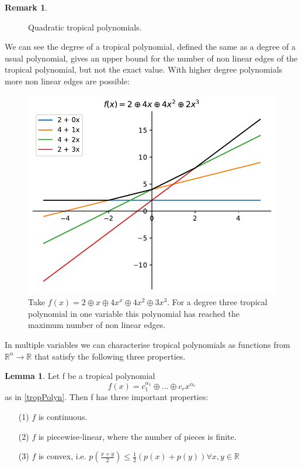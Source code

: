 \documentclass{article}
\theoremstyle{definition}
\newtheorem{lemma}[theorem]{Lemma}
\newtheorem{remark}[theorem]{Remark}
\begin{document}
\begin{remark}
\begin{figure}[h]
\caption{Quadratic tropical polynomials.}
\label{fig:image2}
\end{figure}

We can see the degree of a tropical polynomial, defined the same as a degree of a usual polynomial, gives an upper bound for the number of non linear edges of the tropical polynomial, but not the exact value. With higher degree polynomials more non linear edges are possible:


\begin{figure}[H]
\centering
\includegraphics[scale=0.75]{graphics/third_trop_pol.pdf}
\caption{Take $f(x)=2 \oplus x \oplus 4x^{x} \oplus 4x^{2} \oplus 3x^{3}$. For a degree three tropical polynomial in one variable this polynomial has reached the maximum number of non linear edges.}
\label{fig:fs_mi}
\end{figure}


\end{remark}

In multiple variables we can characterise tropical polynomials as functions from $\mathbb{R}^{n} \to \mathbb{R}$ that satisfy the following three properties.

\begin{lemma}\label{lemma:trop_properties}
Let f be a tropical polynomial
$$ f(x) = c_1^{\alpha_1} \oplus \dots \oplus c_r x^{\alpha_r}$$ as in \ref{tropPolyn}. Then f has three important properties:
\begin{itemize}
\item[(1)]
$f$ is continuous.
\item[(2)]
$f$ is piecewise-linear, where the number of pieces is finite.
\item[(3)]
$f$ is convex, i.e. $p(\frac{x + y}{2}) \leq \frac{1}{2}(p(x)+p(y)) \forall x,y \in \mathbb{R}$
\end{itemize}
\end{lemma}
\end{document}
